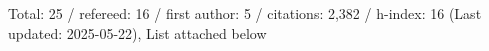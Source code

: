 Total: 25 / refereed: 16 / first author: 5 / citations: 2,382 / h-index: 16 (Last updated: 2025-05-22), List attached below